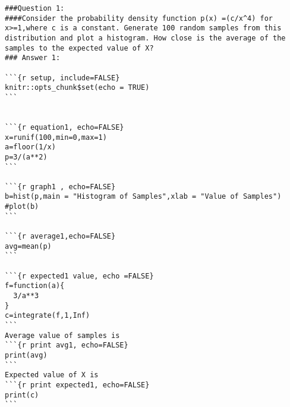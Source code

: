 \documentclass{article}
\begin{document}
\begin{lstlisting}
###Question 1:
####Consider the probability density function p(x) =(c/x^4) for x>=1,where c is a constant. Generate 100 random samples from this distribution and plot a histogram. How close is the average of the samples to the expected value of X?
### Answer 1:

```{r setup, include=FALSE}
knitr::opts_chunk$set(echo = TRUE)
```


```{r equation1, echo=FALSE}
x=runif(100,min=0,max=1)
a=floor(1/x)
p=3/(a**2)
```

```{r graph1 , echo=FALSE}
b=hist(p,main = "Histogram of Samples",xlab = "Value of Samples")
#plot(b)
```

```{r average1,echo=FALSE}
avg=mean(p)
```

```{r expected1 value, echo =FALSE}
f=function(a){
  3/a**3
}
c=integrate(f,1,Inf)
```
Average value of samples is
```{r print avg1, echo=FALSE}
print(avg)
```
Expected value of X is
```{r print expected1, echo=FALSE}
print(c)
```

\end{lstlisting}

\end{document}
